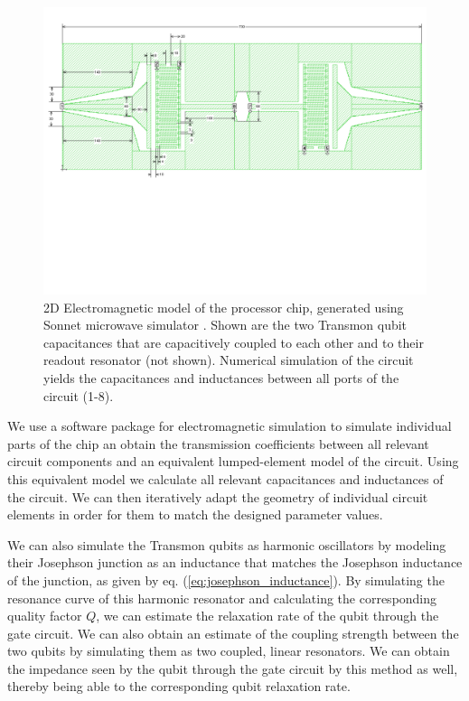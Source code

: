 \begin{figure}[ht!]
	\centering
	\includegraphics[width=\textwidth]{./material/figures/2-qubit-processor/sonnet_simulation_of_qubit_chip}
	\caption[]{2D Electromagnetic model of the processor chip, generated using Sonnet microwave simulator \citep{}. Shown are the two Transmon qubit capacitances that are capacitively coupled to each other and to their readout resonator (not shown). Numerical simulation of the circuit yields the capacitances and inductances between all ports of the circuit (1-8).}
	\label{fig:sonnet_model_of_qubit_chip}
\end{figure}

We use a software package for electromagnetic simulation \citep{} to simulate individual parts of the chip an obtain the transmission coefficients between all relevant circuit components and an equivalent lumped-element model of the circuit. Using this equivalent model we calculate all relevant capacitances and inductances of the circuit. We can then iteratively adapt the geometry of individual circuit elements in order for them to match the designed parameter values.

\smallskip

We can also simulate the Transmon qubits as harmonic oscillators by modeling their Josephson junction as an inductance that matches the Josephson inductance of the junction, as given by eq. (\ref{eq:josephson_inductance}). By simulating the resonance curve of this harmonic resonator and calculating the corresponding quality factor $Q$, we can estimate the relaxation rate of the qubit through the gate circuit. We can also obtain an estimate of the coupling strength between the two qubits by simulating them as two coupled, linear resonators. We can obtain the impedance seen by the qubit through the gate circuit by this method as well, thereby being able to the corresponding qubit relaxation rate.


